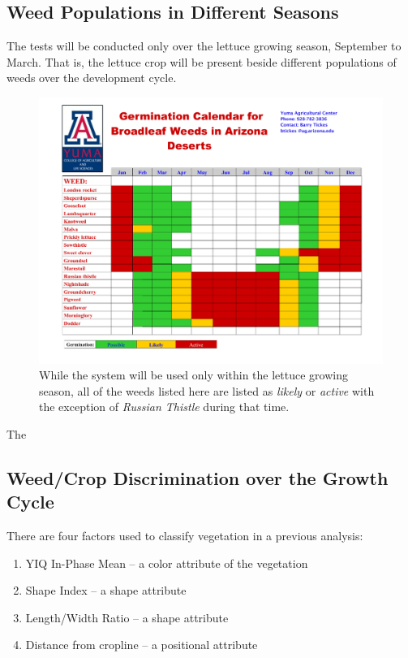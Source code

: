 \documentclass[12pt]{article}
\begin{document}
\subsection{Weed Populations in Different Seasons}
The tests will be conducted only over the lettuce growing season, September to March. That is, the lettuce crop will be present beside different populations of weeds over the development cycle.
\begin{figure}[H]
	\centering
	\includegraphics[width=0.75\linewidth]{./figures/broadleaf-calendar.pdf}
	\caption[Germination schedule for broadleaf weeds]{While the system will be used only within the lettuce growing season, all of the weeds listed here are listed as \textit{likely} or \textit{active} with the exception of \textit{Russian Thistle} during that time.}
	\label{fig:weed-germination}
\end{figure}

The

\subsection{Weed/Crop Discrimination over the Growth Cycle}
There are four factors used to classify vegetation in a previous analysis:
\begin{enumerate}
	\item{YIQ In-Phase Mean -- a color attribute of the vegetation}
	\item{Shape Index -- a shape attribute}
	\item{Length/Width Ratio -- a shape attribute}
	\item{Distance from cropline -- a positional attribute}
\end{enumerate}
\end{document}
